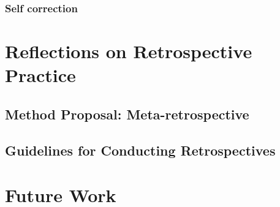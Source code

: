 \subsubsection{Self correction}

\clearpage
\section{Reflections on Retrospective Practice}
\subsection{Method Proposal: Meta-retrospective}

\subsection{Guidelines for Conducting Retrospectives}

\clearpage
\section{Future Work}
